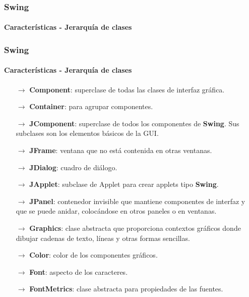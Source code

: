 \documentclass{beamer}
\begin{document}
    \begin{frame}
		\frametitle{Swing}
		\framesubtitle{Caracter\'isticas - Jerarqu\'ia de clases}
		\begin{center}
		\end{center}
	\end{frame}

	\begin{frame}
		\frametitle{Swing}
		\framesubtitle{Caracter\'isticas - Jerarqu\'ia de clases}
		
		{\scriptsize
		\begin{itemize}
		    \item[$\rightarrow$] \textbf{Component}: superclase de todas las clases de interfaz gr\'afica.
		    \item[$\rightarrow$] \textbf{Container}: para agrupar componentes.
            \item[$\rightarrow$] \textbf{JComponent}: superclase de todos los componentes de \textbf{Swing}. Sus subclases son los elementos b\'asicos de la GUI.
            \item[$\rightarrow$] \textbf{JFrame}: ventana que no est\'a contenida en otras ventanas.
            \item[$\rightarrow$] \textbf{JDialog}: cuadro de di\'alogo.
            \item[$\rightarrow$] \textbf{JApplet}: subclase de Applet para crear applets tipo \textbf{Swing}.
            \item[$\rightarrow$] \textbf{JPanel}: contenedor invisible que mantiene componentes de interfaz y que se puede anidar, coloc\'andose en otros paneles o en ventanas.
            \item[$\rightarrow$] \textbf{Graphics}: clase abstracta que proporciona contextos gr\'aficos donde dibujar cadenas de texto, l\'ineas y otras formas sencillas.
            \item[$\rightarrow$] \textbf{Color}: color de los componentes gr\'aficos.
            \item[$\rightarrow$] \textbf{Font}: aspecto de los caracteres.
            \item[$\rightarrow$] \textbf{FontMetrics}: clase abstracta para propiedades de las fuentes.
		\end{itemize}}
	\end{frame}
\end{document}
